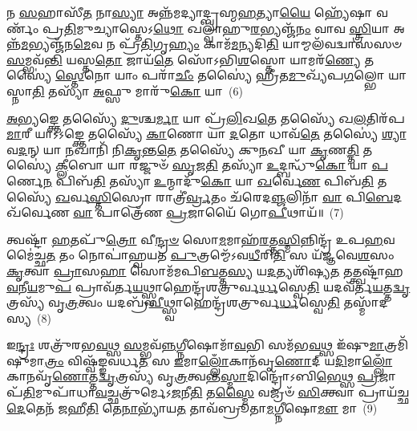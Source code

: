 𑌨 \ul{𑌸}\-𑌹𑌾𑌸𑍀᳴\-\ul{𑌤} 𑌨𑌾\-\ul{𑌸𑍍𑌯𑌾} 𑌅𑌨𑍍𑌨᳴𑌮𑌦𑍍𑌯𑌾𑌦𑍍𑌬𑍍𑌰𑌹𑍍𑌮\-\ul{𑌹}\-𑌤𑍍𑌯𑌾\-\ul{𑌯𑍈} 𑌹𑍍𑌯𑍇᳴𑌷𑌾 𑌵𑌰𑍍𑌣𑌂᳴ 𑌪𑍍𑌰\-\ul{𑌤𑌿}\-𑌮𑍁𑌚𑍍𑌯𑌾𑌸𑍍𑌤𑍇\-𑌽\-\ul{𑌥𑍋} 𑌖𑌲𑍍𑌵𑌾᳴𑌹𑍁\-\ul{𑌰}\-𑌭𑍍𑌯𑌞𑍍𑌜᳴\-\ul{𑌨𑌂} 𑌵𑌾𑌵 \ul{𑌸𑍍𑌤𑍍𑌰𑌿}\-𑌯𑌾 𑌅𑌨𑍍𑌨᳴\-\ul{𑌮}\-𑌭𑍍𑌯𑌞𑍍𑌜᳴𑌨\-\ul{𑌮𑍇}\-𑌵 𑌨 𑌪𑍍𑌰᳴\-\ul{𑌤𑌿}\-𑌗𑍃\-\ul{𑌹𑍍𑌯𑌂} 𑌕𑌾𑌮᳴\-\ul{𑌮}\-𑌨𑍍𑌯𑌦𑌿\-\ul{𑌤𑌿} 𑌯𑌾𑌮𑍍𑌮𑌲᳴𑌵𑌦𑍍𑌵𑌾𑌸𑌸𑍞 \ul{𑌸}\-𑌮𑍍𑌭𑌵᳴\-\ul{𑌨𑍍𑌤𑌿} 𑌯𑌸𑍍𑌤\-\ul{𑌤𑍋} 𑌜𑌾𑌯᳴\-\ul{𑌤𑍇} 𑌸𑍋᳴\-𑌽𑌭𑌿\-\ul{𑌶}\-𑌸𑍍𑌤𑍋 𑌯𑌾𑌮𑌰᳴\-\ul{𑌣𑍍𑌯𑍇} 𑌤𑌸𑍍𑌯𑍈॑ \ul{𑌸𑍍𑌤𑍇}\-𑌨𑍋 𑌯𑌾𑌂 𑌪𑌰𑌾᳴\-\ul{𑌚𑍀𑌂} 𑌤𑌸𑍍𑌯𑍈॑ 𑌹𑍍𑌰𑍀𑌤\-\ul{𑌮𑍁}\-𑌖𑍍𑌯᳴𑌪\-\ul{𑌗}\-𑌲𑍍𑌭𑍋 𑌯𑌾 𑌸𑍍𑌨𑌾\-\ul{𑌤𑌿} 𑌤𑌸𑍍𑌯𑌾᳴ \ul{𑌅}\-𑌫𑍍𑌸𑍁 𑌮𑌾𑌰𑍁᳴\-\ul{𑌕𑍋} 𑌯𑌾~(6)

\-\ul{𑌅}\-\-\ul{𑌭𑍍𑌯}\-𑌙𑍍𑌕𑍍𑌤𑍇 𑌤𑌸𑍍𑌯𑍈᳴ \ul{𑌦𑍁}\-𑌶𑍍𑌚\-\ul{𑌰𑍍𑌮𑌾} 𑌯𑌾 𑌪𑍍𑌰᳴\-\ul{𑌲𑌿}\-𑌖\-\ul{𑌤𑍇} 𑌤𑌸𑍍𑌯𑍈᳴ 𑌖\-\ul{𑌲}\-𑌤𑌿𑌰᳴𑌪\-\ul{𑌮𑌾}\-𑌰𑍀 𑌯𑌾\-𑌽\-𑌽𑌙𑍍𑌕𑍍𑌤𑍇 𑌤𑌸𑍍𑌯𑍈᳴ \ul{𑌕𑌾}\-𑌣𑍋 𑌯𑌾 \ul{𑌦}\-𑌤𑍋 𑌧𑌾𑌵᳴\-\ul{𑌤𑍇} 𑌤𑌸𑍍𑌯𑍈॑ \ul{𑌶𑍍𑌯𑌾}\-𑌵\-\ul{𑌦}\-𑌨𑍍 𑌯𑌾 \ul{𑌨}\-𑌖𑌾𑌨𑌿᳴ 𑌨𑌿\-\ul{𑌕𑍃}\-𑌨𑍍𑌤\-\ul{𑌤𑍇} 𑌤𑌸𑍍𑌯𑍈᳴ 𑌕𑍁\-\ul{𑌨}\-𑌖𑍀 𑌯𑌾 \ul{𑌕𑍃}\-𑌣\-\ul{𑌤𑍍𑌤𑌿} 𑌤𑌸𑍍𑌯𑍈॑ \ul{𑌕𑍍𑌲𑍀}\-𑌬𑍋 𑌯𑌾 𑌰𑌜𑍍𑌜𑍁𑍞᳴ \ul{𑌸𑍃}\-𑌜\-\ul{𑌤𑌿} 𑌤𑌸𑍍𑌯𑌾᳴ \ul{𑌉}\-𑌦𑍍𑌬𑌨𑍍𑌧𑍁᳴\-\ul{𑌕𑍋} 𑌯𑌾 \ul{𑌪}\-𑌰𑍍𑌣𑍇\-\ul{𑌨} 𑌪𑌿𑌬᳴\-\ul{𑌤𑌿} 𑌤𑌸𑍍𑌯𑌾᳴ \ul{𑌉}\-𑌨𑍍𑌮𑌾𑌦𑍁᳴\-\ul{𑌕𑍋} 𑌯𑌾 \ul{𑌖}\-𑌰𑍍𑌵𑍇\-\ul{𑌣} 𑌪𑌿𑌬᳴\-\ul{𑌤𑌿} 𑌤𑌸𑍍𑌯𑍈᳴ \ul{𑌖}\-𑌰𑍍𑌵\-\ul{𑌸𑍍𑌤𑌿}\-𑌸𑍍𑌰𑍋 𑌰𑌾𑌤𑍍𑌰𑍀॑\-\ul{𑌰𑍍𑌵𑍍𑌰}\-𑌤𑌂 𑌚᳴𑌰𑍇𑌦\-\ul{𑌞𑍍𑌜}\-𑌲𑌿𑌨𑌾᳴ \ul{𑌵𑌾} 𑌪𑌿\-\ul{𑌬𑍇}\-𑌦𑌖᳴𑌰𑍍𑌵𑍇𑌣 \ul{𑌵𑌾} 𑌪𑌾𑌤𑍍𑌰𑍇᳴𑌣 \ul{𑌪𑍍𑌰}\-𑌜𑌾𑌯𑍈᳴ 𑌗𑍋\-\ul{𑌪𑍀}\-𑌥𑌾𑌯᳴॥~(7)

{\anuvakamend[{𑌯𑌥𑍍𑌸𑍋᳴\-\ul{𑌮}\-𑌪𑌾𑌨᳴𑌨𑍍𑌤𑍇 \ul{𑌵𑍃}\-𑌕𑍍𑌣𑌾𑌤𑍍𑌤\-\ul{𑌸𑍍𑌯} 𑌨𑌾𑌶𑍍𑌯𑌂᳴ 𑌵𑌦𑍇\-\ul{𑌤} 𑌮𑌾𑌰𑍁᳴\-\ul{𑌕𑍋} 𑌯𑌾\-𑌽𑌖᳴𑌰𑍍𑌵𑍇𑌣 \ul{𑌵𑌾} 𑌤𑍍𑌰𑍀𑌣𑌿᳴ 𑌚}]}%

𑌤𑍍𑌵𑌷𑍍𑌟𑌾᳴ \ul{𑌹}\-𑌤𑌪𑍁᳴\-\ul{𑌤𑍍𑌰𑍋} 𑌵𑍀\-\ul{𑌨𑍍𑌦𑍍𑌰}\-\-\ul{𑍞} 𑌸𑍋\-\ul{𑌮}\-𑌮𑌾𑌹᳴\-\ul{𑌰}\-𑌤𑍍𑌤\-\ul{𑌸𑍍𑌮𑌿}\-𑌨𑍍𑌨𑌿𑌨𑍍𑌦𑍍𑌰᳴ 𑌉𑌪\-\ul{𑌹}\-𑌵𑌮𑍈॑𑌚𑍍𑌛\-\ul{𑌤} 𑌤𑌂 𑌨𑍋𑌪𑌾॑𑌹𑍍𑌵𑌯𑌤 \ul{𑌪𑍁}\-𑌤𑍍𑌰𑌮𑍍𑌮𑍇᳴\-𑌽𑌵\-\ul{𑌧𑍀}\-𑌰𑌿\-\ul{𑌤𑌿} 𑌸 𑌯᳴𑌜𑍍𑌞𑌵𑍇\-\ul{𑌶}\-𑌸𑌂 \ul{𑌕𑍃}\-𑌤𑍍𑌵𑌾 \ul{𑌪𑍍𑌰𑌾}\-𑌸\-\ul{𑌹𑌾} 𑌸𑍋𑌮᳴𑌮𑌪𑌿\-\ul{𑌬}\-𑌤𑍍𑌤\-\ul{𑌸𑍍𑌯} 𑌯\-\ul{𑌦}\-𑌤𑍍𑌯𑌶𑌿᳴𑌷𑍍𑌯\-\ul{𑌤} 𑌤𑌤𑍍𑌤𑍍𑌵𑌷𑍍𑌟𑌾᳴𑌹\-\ul{𑌵}\-𑌨𑍀\-\ul{𑌯}\-𑌮𑍁\-\ul{𑌪} 𑌪𑍍𑌰𑌾𑌵᳴𑌰𑍍𑌤\-\ul{𑌯}\-𑌥𑍍𑌸𑍍𑌵𑌾𑌹𑍇𑌨𑍍𑌦𑍍𑌰᳴𑌶𑌤𑍍𑌰𑍁𑌰𑍍𑌵\-\ul{𑌰𑍍𑌧}\-𑌸𑍍𑌵𑍇\-\ul{𑌤𑌿} 𑌯𑌦𑌵᳴𑌰𑍍𑌤\-\ul{𑌯}\-𑌤𑍍𑌤\-\ul{𑌦𑍍𑌵𑍃}\-𑌤𑍍𑌰𑌸𑍍𑌯᳴ 𑌵𑍃\-\ul{𑌤𑍍𑌰}\-𑌤𑍍𑌵𑌂 𑌯𑌦𑌬𑍍𑌰᳴\-\ul{𑌵𑍀}\-𑌥𑍍𑌸𑍍𑌵𑌾𑌹𑍇𑌨𑍍𑌦𑍍𑌰᳴𑌶𑌤𑍍𑌰𑍁𑌰𑍍𑌵\-\ul{𑌰𑍍𑌧}\-𑌸𑍍𑌵𑍇\-\ul{𑌤𑌿} 𑌤𑌸𑍍𑌮𑌾᳴𑌦𑌸𑍍𑌯~(8)

𑌇\-\ul{𑌨𑍍𑌦𑍍𑌰𑌃} 𑌶𑌤𑍍𑌰𑍁᳴𑌰𑌭\-\ul{𑌵}\-𑌥𑍍𑌸 \ul{𑌸}\-𑌮𑍍𑌭𑌵᳴\-\ul{𑌨𑍍𑌨}\-𑌗𑍍𑌨𑍀𑌷𑍋𑌮𑌾᳴\-\ul{𑌵}\-𑌭𑌿 𑌸𑌮᳴𑌭\-\ul{𑌵}\-𑌥𑍍𑌸 𑌇᳴𑌷𑍁\-\ul{𑌮𑌾}\-𑌤𑍍𑌰𑌮𑌿᳴𑌷𑍁𑌮𑌾\-\ul{𑌤𑍍𑌰𑌂} 𑌵𑌿𑌷𑍍𑌵᳴𑌙𑍍𑌙𑌵𑌰𑍍𑌧\-\ul{𑌤} 𑌸 \ul{𑌇}\-𑌮𑌾\-\ul{𑌲𑍍𑌲𑍋𑌁}\-𑌕𑌾𑌨᳴𑌵𑍃\-\ul{𑌣𑍋}\-𑌦𑍍 𑌯\-\ul{𑌦𑌿}\-𑌮𑌾\-\ul{𑌲𑍍𑌲𑍋𑌁}\-𑌕𑌾𑌨𑌵𑍃᳴\-\ul{𑌣𑍋}\-𑌤𑍍𑌤\-\ul{𑌦𑍍𑌵𑍃}\-𑌤𑍍𑌰𑌸𑍍𑌯᳴ 𑌵𑍃\-\ul{𑌤𑍍𑌰}\-𑌤𑍍𑌵𑌨𑍍𑌤\-\ul{𑌸𑍍𑌮𑌾}\-𑌦𑌿𑌨𑍍𑌦𑍍𑌰𑍋᳴\-𑌽𑌬𑌿\-\ul{𑌭𑍇}\-𑌥𑍍𑌸 \ul{𑌪𑍍𑌰}\-𑌜𑌾𑌪᳴\-\ul{𑌤𑌿}\-𑌮𑍁𑌪𑌾᳴𑌧𑌾\-\ul{𑌵}\-𑌚𑍍𑌛𑌤𑍍𑌰𑍁᳴𑌰𑍍𑌮𑍇\-𑌽\-\ul{𑌜}\-𑌨𑍀\-\ul{𑌤𑌿} 𑌤\-\ul{𑌸𑍍𑌮𑍈} 𑌵𑌜𑍍𑌰𑍞᳴ \ul{𑌸𑌿}\-𑌕𑍍𑌤𑍍𑌵𑌾 𑌪𑍍𑌰𑌾𑌯᳴𑌚𑍍𑌛\-\ul{𑌦𑍇}\-𑌤𑍇𑌨᳴ \ul{𑌜}\-𑌹𑍀\-\ul{𑌤𑌿} 𑌤𑍇\-\ul{𑌨𑌾}\-𑌭𑍍𑌯𑌾᳴𑌯\-\ul{𑌤} 𑌤𑌾𑌵᳴𑌬𑍍𑌰𑍂𑌤𑌾\-\ul{𑌮}\-𑌗𑍍𑌨𑍀𑌷𑍋\-\ul{𑌮𑍗} 𑌮𑌾~(9)

